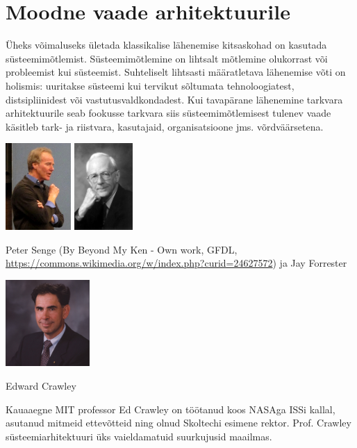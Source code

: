 \documentclass{tufte-book}
\begin{document}
\section{Moodne vaade arhitektuurile}
Üheks võimaluseks ületada klassikalise lähenemise kitsaskohad on kasutada süsteemimõtlemist. Süsteemimõtlemine on lihtsalt mõtlemine olukorrast või probleemist kui süsteemist. Suhteliselt lihtsasti määratletava lähenemise võti on holismis: uuritakse süsteemi kui tervikut sõltumata tehnoloogiatest, distsipliinidest või vastutusvaldkondadest. Kui tavapärane lähenemine tarkvara arhitektuurile seab fookusse tarkvara siis süsteemimõtlemisest tulenev vaade käsitleb tark- ja riistvara, kasutajaid, organisatsioone jms. võrdväärsetena.

\begin{marginfigure}
	\begin{center}
		\includegraphics[height=3.3cm]{Peter_Senge_at_Quest_to_Learn.jpg}
		\includegraphics[height=3.3cm]{jayforrester.jpg}
		\caption{Peter Senge (By Beyond My Ken - Own work, GFDL, \url{https://commons.wikimedia.org/w/index.php?curid=24627572}) ja Jay Forrester}
		\label{fig:legendid}
	\end{center}
\end{marginfigure}


\begin{marginfigure}
	\begin{center}
		\includegraphics[height=3.3cm]{MIT-Ed-Crawley_0.jpg}
		\caption{Edward Crawley}
		\label{fig:ed}
	\end{center}
	Kauaaegne MIT professor Ed Crawley on töötanud koos NASAga ISSi kallal, asutanud mitmeid ettevõtteid ning olnud Skoltechi esimene rektor. Prof. Crawley süsteemiarhitektuuri üks vaieldamatuid suurkujusid maailmas.
\end{marginfigure}
\end{document}
